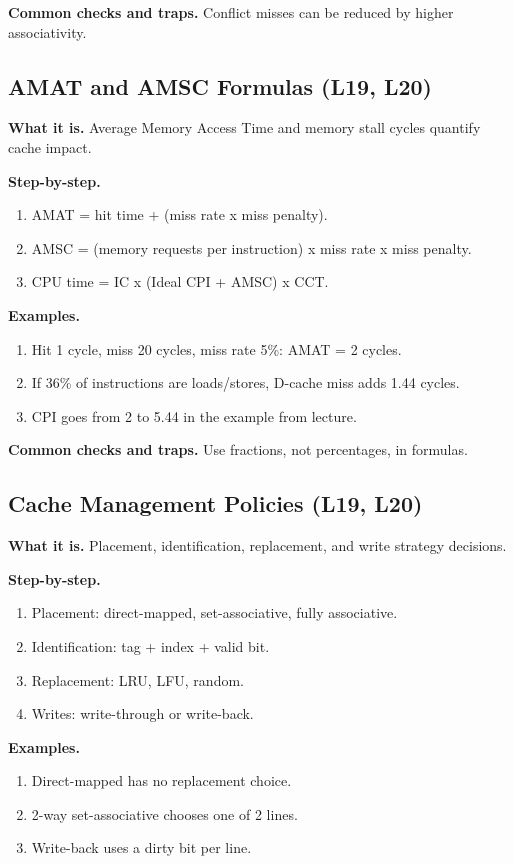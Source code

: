 \documentclass[11pt]{article}
\begin{document}
\textbf{Common checks and traps.} Conflict misses can be reduced by higher associativity.

\subsection{AMAT and AMSC Formulas (L19, L20)}
\textbf{What it is.} Average Memory Access Time and memory stall cycles quantify cache impact.

\textbf{Step-by-step.}
\begin{enumerate}[leftmargin=*]
  \item AMAT = hit time + (miss rate x miss penalty).
  \item AMSC = (memory requests per instruction) x miss rate x miss penalty.
  \item CPU time = IC x (Ideal CPI + AMSC) x CCT.
\end{enumerate}

\textbf{Examples.}
\begin{enumerate}[leftmargin=*]
  \item Hit 1 cycle, miss 20 cycles, miss rate 5\%: AMAT = 2 cycles.
  \item If 36\% of instructions are loads/stores, D-cache miss adds 1.44 cycles.
  \item CPI goes from 2 to 5.44 in the example from lecture.
\end{enumerate}

\textbf{Common checks and traps.} Use fractions, not percentages, in formulas.

\subsection{Cache Management Policies (L19, L20)}
\textbf{What it is.} Placement, identification, replacement, and write strategy decisions.

\textbf{Step-by-step.}
\begin{enumerate}[leftmargin=*]
  \item Placement: direct-mapped, set-associative, fully associative.
  \item Identification: tag + index + valid bit.
  \item Replacement: LRU, LFU, random.
  \item Writes: write-through or write-back.
\end{enumerate}

\textbf{Examples.}
\begin{enumerate}[leftmargin=*]
  \item Direct-mapped has no replacement choice.
  \item 2-way set-associative chooses one of 2 lines.
  \item Write-back uses a dirty bit per line.
\end{enumerate}
\end{document}
